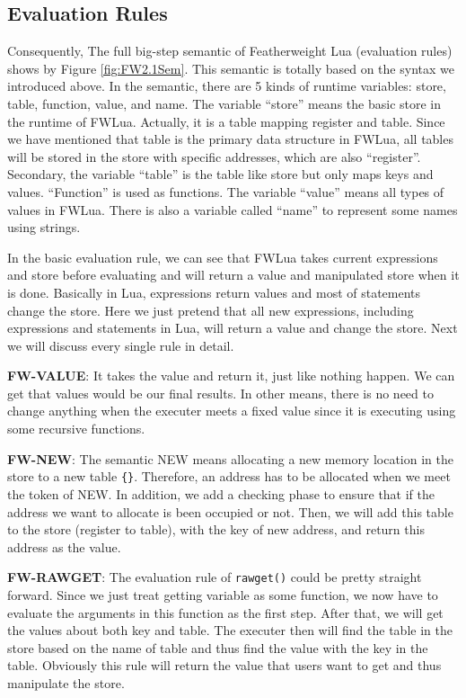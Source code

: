 \subsection{Evaluation Rules}\label{sec: FWLUAsemantic}
Consequently, The full big-step semantic of Featherweight Lua (evaluation rules) shows by Figure \ref{fig:FW2.1Sem}. This semantic is totally based on the syntax we introduced above. In the semantic, there are 5 kinds of runtime variables: store, table, function, value, and name. The variable ``store'' means the basic store in the runtime of FWLua. Actually, it is a table mapping register and table. Since we have mentioned that table is the primary data structure in FWLua, all tables will be stored in the store with specific addresses, which are also ``register''. Secondary, the variable ``table'' is the table like store but only maps keys and values. ``Function'' is used as functions. The variable ``value'' means all types of values in FWLua. There is also a variable called ``name'' to represent some names using strings.

In the basic evaluation rule, we can see that FWLua takes current expressions and store before evaluating and will return a value and manipulated store when it is done. Basically in Lua, expressions return values and most of statements change the store. Here we just pretend that all new expressions, including expressions and statements in Lua, will return a value and change the store. Next we will discuss every single rule in detail.

{\bf FW-VALUE}: It takes the value and return it, just like nothing happen. We can get that values would be our final results. In other means, there is no need to change anything when the executer meets a fixed value since it is executing using some recursive functions. 

{\bf FW-NEW}: The semantic NEW means allocating a new memory location in the store to a new table {\tt \{\}}. Therefore, an address has to be allocated when we meet the token of NEW. In addition, we add a checking phase to ensure that if the address we want to allocate is been occupied or not. Then, we will add this table to the store (register to table), with the key of new address, and return this address as the value.

{\bf FW-RAWGET}: The evaluation rule of {\tt rawget()} could be pretty straight forward. Since we just treat getting variable as some function, we now have to evaluate the arguments in this function as the first step. After that, we will get the values about both key and table. The executer then will find the table in the store based on the name of table and thus find the value with the key in the table. Obviously this rule will return the value that users want to get and thus manipulate the store.

